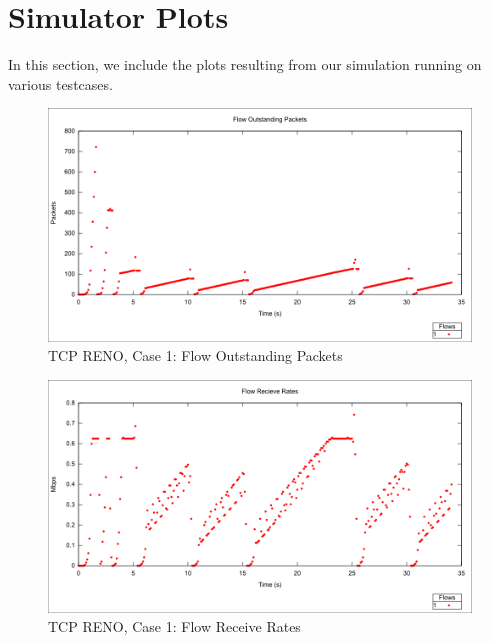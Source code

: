 

\section{Simulator Plots}
In this section, we include the plots resulting from our simulation running on various testcases. 

\newpage

\begin{figure}[htbp]
    \centering
    \includegraphics[width=\textwidth]{reno1/Flow_Outstanding_Packets.png}
    \caption{TCP RENO, Case 1: Flow Outstanding Packets}
\end{figure}


\begin{figure}[htbp]
    \centering
    \includegraphics[width=\textwidth]{reno1/Flow_Receive_Rates.png}
    \caption{TCP RENO, Case 1: Flow Receive Rates }
\end{figure}


